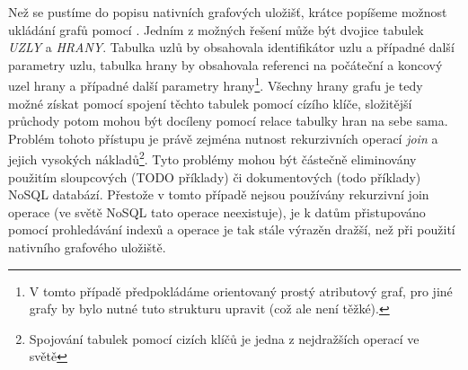 Než se pustíme do popisu nativních grafových uložišť, krátce popíšeme možnost ukládání grafů pomocí . Jedním z možných řešení může být dvojice tabulek \textit{UZLY} a \textit{HRANY}. Tabulka uzlů by obsahovala identifikátor uzlu a případné další parametry uzlu, tabulka hrany by obsahovala referenci na počáteční a koncový uzel hrany a případné další parametry hrany\footnote{V tomto případě předpokládáme orientovaný prostý atributový graf, pro jiné grafy by bylo nutné tuto strukturu upravit (což ale není těžké).}. Všechny hrany grafu je tedy možné získat pomocí spojení těchto tabulek pomocí cízího klíče, složitější průchody potom mohou být docíleny pomocí relace tabulky hran na sebe sama. Problém tohoto přístupu je právě zejména nutnost rekurzivních operací \textit{join} a jejich vysokých nákladů\footnote{Spojování tabulek pomocí cizích klíčů je jedna z nejdražších operací ve světě }. Tyto problémy mohou být částečně eliminovány použitím sloupcových (TODO příklady) či dokumentových (todo příklady) NoSQL databází. Přestože v tomto případě nejsou používány rekurzivní join operace (ve světě NoSQL tato operace neexistuje), je k datům přistupováno pomocí prohledávání indexů a operace je tak stále výrazěn dražší, než při použití nativního grafového uložiště.\cite{Lal15} 


